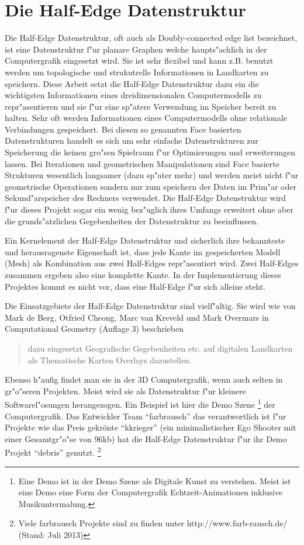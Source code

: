 \documentclass[pagesize, paper=a4, fontsize=12pt,titlepage=true, headings=small, headnosepline, abstractoff, liststotoc, nochapterprefix, plainheadsepline]{scrreprt}
\newcommand{\HES}{Half-Edge Datenstruktur }
\begin{document}
	\section {Die \HES}
		Die Half-Edge Datenstruktur, oft auch als Doubly-connected edge list bezeichnet, ist eine Datenstruktur f"ur planare Graphen welche haupts"achlich in der Computergrafik eingesetzt wird. Sie ist sehr flexibel und kann z.B. benutzt werden um topologische und strukutrelle Informationen in Landkarten zu speichern. Diese Arbeit setzt die \HES dazu ein die wichtigsten Informationen eines dreidimensionalen Computermodells zu repr"asentieren und sie f"ur eine sp"atere Verwendung im Speicher bereit zu halten. Sehr oft werden Informationen eines Computermodells ohne relationale Verbindungen gespeichert. Bei diesen so genannten Face basierten Datenstrukturen handelt es sich um sehr einfache Datenstrukturen zur Speicherung die keinen gro"sen Spielraum f"ur Optimierungen und erweiterungen lassen. Bei Iterationen und geometrischen Manipulationen sind Face basierte Strukturen wesentlich langsamer (dazu sp"ater mehr) und werden meist nicht f"ur geometrische Operationen sondern nur zum speichern der Daten im Prim"ar oder Sekund"arspeicher des Rechners verwendet. Die \HES wird f"ur dieses Projekt sogar ein wenig bez"uglich ihres Umfangs erweitert ohne aber die grunds"atzlichen Gegebenheiten der Datenstruktur zu beeinflussen.

Ein Kernelement der \HES und sicherlich ihre bekannteste und herausragenste Eigenschaft ist, dass jede Kante im gespeicherten Modell (Mesh) als Kombination aus zwei Half-Edges repr"asentiert wird. Zwei Half-Edges zusammen ergeben also eine komplette Kante. In der Implementierung dieses Projektes kommt es nicht vor, dass eine Half-Edge f"ur sich alleine steht.

Die Einsatzgebiete der \HES sind vielf"altig. Sie wird wie von Mark de Berg, Otfried Cheong, Marc van Kreveld und Mark Overmars in Computational Geometry \cite{vanMarkdeBerg.2008} (Auflage 3) beschrieben  \begin{quote}dazu eingesetzt Geografische Gegebenheiten etc. auf digitalen Landkarten  als Thematische Karten Overlays dazustellen. \cite[S.~29]{vanMarkdeBerg.2008}\end{quote} Ebenso h"aufig findet man sie in der 3D Computergrafik, wenn auch selten in gr"o"seren Projekten. Meist wird sie als Datenstruktur f"ur kleinere Softwarel"osungen herangezogen. Ein Beispiel ist hier die Demo Szene \footnote{Eine Demo ist in der Demo Szene als Digitale Kunst zu verstehen. Meist ist eine Demo eine Form der Computergrafik Echtzeit-Animationen inklusive Musikuntermalung.} der Computergrafik. Das Entwickler Team "`farbrausch"' das verantwortlich ist f"ur Projekte wie das Preis gekrönte "`kkrieger"' (ein minimalistischer Ego Shooter mit einer Gesamtgr"o"se von 96kb) hat die \HES f"ur ihr Demo Projekt "`debris"' genutzt. \footnote{Viele farbrausch Projekte sind zu finden unter http://www.farb-rausch.de/ (Stand: Juli 2013)}
\end{document}

